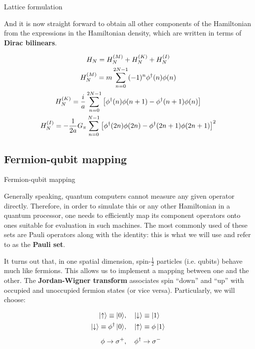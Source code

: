 \documentclass[9pt, handout, aspectratio=169]{beamer}	%
\begin{document}
\begin{frame}[allowframebreaks]{Lattice formulation}
\break

	And it is now straight forward to obtain all other components of the Hamiltonian from the expressions in the Hamiltonian density, which are written in terms of \textbf{Dirac bilinears}.

	\vspace{1em}

	\begin{gather*}
	  H_{N} = H_{N}^{(M)} + H_{N}^{(K)} + H_{N}^{(I)}
	    \label{eq:NJL1-staggered-discretization} \\
	  H_{N}^{(M)} =
	    m \sum_{n=0}^{2N-1} (-1)^{n}\phi^{\dagger}(n)\phi(n) \\
	  H_{N}^{(K)} =
	    \frac{i}{a} \sum_{n=0}^{2N-1} \qty[
	    \phi^{\dagger}(n)\phi(n+1) - \phi^{\dagger}(n+1)\phi(n)] \\
	  H_{N}^{(I)} =
	    - \frac{1}{2a} G_{\pi} \sum_{n=0}^{N-1} \qty[
	      \phi^{\dagger}(2n)\phi(2n) - \phi^{\dagger}(2n+1)\phi(2n+1)
	    ]^{2}
	\end{gather*}

\end{frame}


\subsection{Fermion-qubit mapping}

\begin{frame}{Fermion-qubit mapping}

	Generally speaking, quantum computers cannot measure any given operator directly. Therefore, in order to simulate this or any other Hamiltonian in a quantum processor, one needs to efficiently map its component operators onto ones suitable for evaluation in such machines. The most commonly used of these sets are Pauli operators along with the identity: this is what we will use and refer to as the \textbf{Pauli set}.

	\medskip

	It turns out that, in one spatial dimension, spin-$\frac{1}{2}$ particles (i.e. qubits) behave much like fermions. This allows us to implement a mapping between one and the other. The \textbf{Jordan-Wigner transform} associates spin ``down'' and ``up'' with occupied and unoccupied fermion states (or vice versa). Particularly, we will choose:

	\begin{align*}
		\ket{\ua} \equiv \ket{0} &\qc
			\ket{\da} \equiv \ket{1} \\
    \ket{\da} \equiv \phi^{\dagger}\ket{0} &\qc
			\ket{\ua} \equiv \phi\ket{1} \\[5pt]
		\phi \ra \sigma^{+} &\qc \phi^{\dagger} \ra \sigma^{-}
	\end{align*}

\end{frame}
\end{document}
